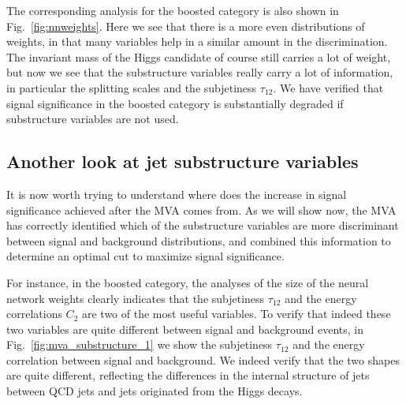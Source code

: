 The corresponding analysis for the boosted category is also
shown in Fig.~\ref{fig:nnweights}.
%
Here we see that there is a more even distributions of weights, in that many
variables help in a similar amount in the discrimination.
%
The invariant mass of the Higgs candidate of course still carries a lot of weight,
but now we see that the substructure variables really carry  a lot of information,
in particular the splitting scales and the subjetiness $\tau_{12}$.
%
We have verified that signal significance in the boosted category is substantially
degraded if substructure variables are not used.




\subsection{Another look at jet substructure variables}

It is now worth trying to understand where does the increase in signal significance
achieved after the MVA comes from.
%
As we will show now, the MVA has correctly identified which of the substructure
variables are more discriminant between signal and background distributions,
and combined this information to determine an optimal cut to maximize signal
significance.

For instance, in the boosted category, the analyses of the
size of the neural network weights clearly indicates that the subjetiness
$\tau_{12}$ and the energy correlations $C_2$ are two of the most useful
variables.
%
To verify that indeed these two variables are quite different between signal
and background events, in Fig.~\ref{fig:mva_substructure_1}
we show the subjetiness $\tau_{12}$ and the energy correlation between
signal and background.
%
We indeed verify that the two shapes are quite different,
reflecting the differences in the internal structure of jets
between QCD jets and jets originated from the Higgs decays.


